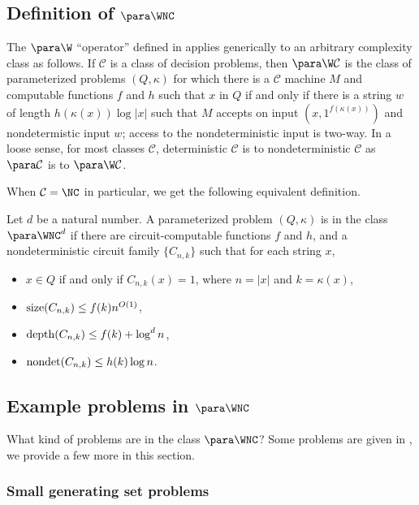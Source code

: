 \subsection{Definition of \texorpdfstring{$\para \WNC$}{paraWNC}}

The $\para \W$ ``operator'' defined in \autocite[Definition~3.1]{est15} applies generically to an arbitrary complexity class as follows.
If $\mathcal{C}$ is a class of decision problems, then $\para \W \mathcal{C}$ is the class of parameterized problems $(Q, \kappa)$ for which there is a $\mathcal{C}$ machine $M$ and computable functions $f$ and $h$ such that $x$ in $Q$ if and only if there is a string $w$ of length $h(\kappa(x)) \log |x|$ such that $M$ accepts on input $(x, 1^{f(\kappa(x))})$ and nondetermistic input $w$; access to the nondeterministic input is two-way.
In a loose sense, for most classes $\mathcal{C}$, deterministic $\mathcal{C}$ is to nondeterministic $\mathcal{C}$ as $\para \mathcal{C}$ is to $\para \W \mathcal{C}$.

When $\mathcal{C} = \NC$ in particular, we get the following equivalent definition.

\begin{definition}
  Let $d$ be a natural number.
  A parameterized problem $(Q, \kappa)$ is in the class $\para \WNC^d$ if there are circuit-computable functions $f$ and $h$, and a nondeterministic circuit family $\{C_{n, k}\}$ such that for each string $x$,
  \begin{itemize}
  \item $x \in Q$ if and only if $C_{n, k}(x) = 1$, where $n = |x|$ and $k = \kappa(x)$,
  \item $\operatorname{size}(C_{n, k}) \leq f(k) n^{O(1)}$,
  \item $\operatorname{depth}(C_{n, k}) \leq f(k) + \log^d n$,
  \item $\operatorname{nondet}(C_{n, k}) \leq h(k) \log n$.
  \end{itemize}
\end{definition}

\subsection{Example problems in \texorpdfstring{$\para \WNC$}{paraWNC}}
\label{sec:rankinwp}

What kind of problems are in the class $\para \WNC$?
Some problems are given in \autocite{est15}, we provide a few more in this section.

\subsubsection{Small generating set problems}

